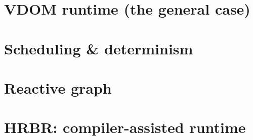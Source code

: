 \documentclass[11pt,oneside]{book}
\begin{document}
\cleardoublepage


\cleardoublepage


\cleardoublepage


\cleardoublepage
\tableofcontents
\cleardoublepage

\mainmatter



\part{VDOM runtime (the general case)}











\part{Scheduling \& determinism}



\part{Reactive graph}


\part{HRBR: compiler-assisted runtime}









\end{document}
